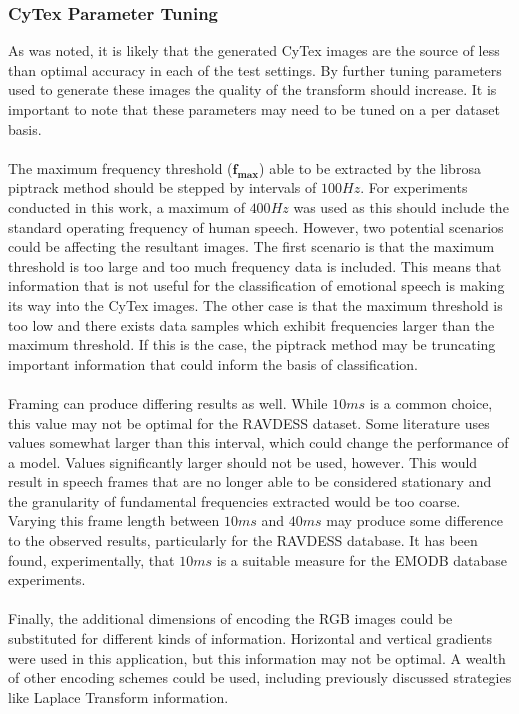 \subsubsection{CyTex Parameter Tuning}
As was noted, it is likely that the generated CyTex images are the source of less than optimal accuracy in each of the test settings. By further tuning parameters used to generate these images the quality of the transform should increase. It is important to note that these parameters may need to be tuned on a per dataset basis.\\ \\
The maximum frequency threshold ($\mathbf{f_{max}}$) able to be extracted by the librosa piptrack method should be stepped by intervals of $100Hz$. For experiments conducted in this work, a maximum of $400Hz$ was used as this should include the standard operating frequency of human speech. However, two potential scenarios could be affecting the resultant images. The first scenario is that the maximum threshold is too large and too much frequency data is included. This means that information that is not useful for the classification of emotional speech is making its way into the CyTex images. The other case is that the maximum threshold is too low and there exists data samples which exhibit frequencies larger than the maximum threshold. If this is the case, the piptrack method may be truncating important information that could inform the basis of classification.\\ \\
Framing can produce differing results as well. While $10ms$ is a common choice, this value may not be optimal for the RAVDESS dataset. Some literature uses values somewhat larger than this interval, which could change the performance of a model. Values significantly larger should not be used, however. This would result in speech frames that are no longer able to be considered stationary and the granularity of fundamental frequencies extracted would be too coarse. Varying this frame length between $10ms$ and $40ms$ may produce some difference to the observed results, particularly for the RAVDESS database. It has been found, experimentally, that $10ms$ is a suitable measure for the EMODB database experiments.\\ \\
Finally, the additional dimensions of encoding the RGB images could be substituted for different kinds of information. Horizontal and vertical gradients were used in this application, but this information may not be optimal. A wealth of other encoding schemes could be used, including previously discussed strategies like Laplace Transform information.

